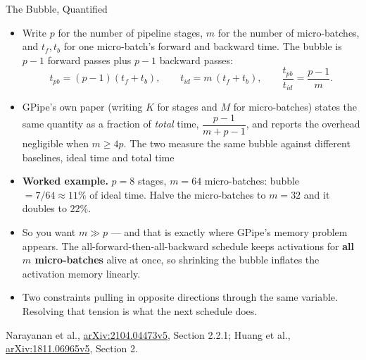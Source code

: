 \begin{frame}[allowframebreaks]{The Bubble, Quantified}
  \begin{itemize}\itemsep0.35em
    \item[\textcolor{red}{$\blacktriangleright$}] Write $p$ for the number of pipeline stages, $m$ for the number of micro-batches, and $t_f, t_b$ for one micro-batch's forward and backward time. The bubble is $p-1$ forward passes plus $p-1$ backward passes:
      \[
        t_{pb} = (p-1)(t_f + t_b), \qquad t_{id} = m\,(t_f + t_b),
        \qquad \frac{t_{pb}}{t_{id}} = \boxed{\frac{p-1}{m}}.
      \]
    \item[\textcolor{red}{$\blacktriangleright$}] GPipe's own paper (writing $K$ for stages and $M$ for micro-batches) states the same quantity as a fraction of \emph{total} time, $\dfrac{p-1}{m+p-1}$, and reports the overhead negligible when $m \geq 4p$. The two measure the same bubble against different baselines, ideal time and total time
    \item[\textcolor{red}{$\blacktriangleright$}] \textbf{Worked example.} $p = 8$ stages, $m = 64$ micro-batches: bubble $= 7/64 \approx 11\%$ of ideal time. Halve the micro-batches to $m = 32$ and it doubles to $22\%$.
    \item[\textcolor{red}{$\blacktriangleright$}] So you want $m \gg p$ --- and that is exactly where GPipe's memory problem appears. The all-forward-then-all-backward schedule keeps activations for \textbf{all $m$ micro-batches} alive at once, so shrinking the bubble inflates the activation memory linearly.
    \item[\textcolor{red}{$\blacktriangleright$}] Two constraints pulling in opposite directions through the same variable. Resolving that tension is what the next schedule does.
  \end{itemize}
  \vspace{0.1em}
  {\scriptsize Narayanan et al., \href{https://arxiv.org/abs/2104.04473v5}{arXiv:2104.04473v5}, Section 2.2.1; Huang et al., \href{https://arxiv.org/abs/1811.06965v5}{arXiv:1811.06965v5}, Section 2.}
\end{frame}

